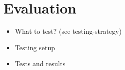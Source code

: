 
\section{Evaluation}\label{sec:evaluation}
  
  \begin{itemize}
    \item What to test? (see testing-strategy)
    \item Testing setup
    \item Tests and results
  \end{itemize}